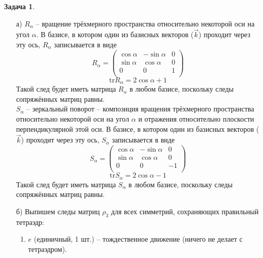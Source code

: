 \documentclass[12pt]{article}
\theoremstyle{definition}
\newtheorem{zad}{Задача}[section]
\begin{document}
\begin{zad}
\begin{itemize}
    \item[а)] $R_\alpha$ -- вращение трёхмерного пространства относительно некоторой оси на угол $\alpha$. В базисе, в котором один из базисных векторов ($\vec{k}$) проходит через эту ось, $R_\alpha$ записывается в виде
    \begin{equation}
        R_\alpha=\left(
    \begin{array}{ccc}
    \cos\alpha & -\sin\alpha & 0\\
    \sin\alpha & \cos\alpha & 0\\
    0 & 0 & 1\\
    \end{array}
    \right)
    \end{equation}
    \begin{equation}
        \boxed{\text{tr}R_\alpha=2\cos\alpha+1}
    \end{equation}
    Такой след будет иметь матрица $R_\alpha$ в любом базисе, поскольку следы сопряжённых матриц равны.\\
    $S_\alpha$ -- зеркальный поворот -- композиция вращения трёхмерного пространства относительно некоторой оси на угол $\alpha$ и отражения относительно плоскости перпендикулярной этой оси. В базисе, в котором один из базисных векторов ($\vec{k}$) проходит через эту ось, $S_\alpha$ записывается в виде
    \begin{equation}
        S_\alpha=\left(
    \begin{array}{ccc}
    \cos\alpha & -\sin\alpha & 0\\
    \sin\alpha & \cos\alpha & 0\\
    0 & 0 & -1\\
    \end{array}
    \right)
    \end{equation}
    \begin{equation}
        \boxed{\text{tr}S_\alpha=2\cos\alpha-1}
    \end{equation}
    Такой след будет иметь матрица $S_\alpha$ в любом базисе, поскольку следы сопряжённых матриц равны.
    \item[б)] Выпишем следы матриц $\rho_3$ для всех симметрий, сохраняющих правильный тетраэдр:
    \begin{enumerate}
        \item $e$ (единичный, 1 шт.) -- тождественное движение (ничего не делает с тетраэдром).

\end{enumerate}
\end{itemize}
\end{zad}
\end{document}
